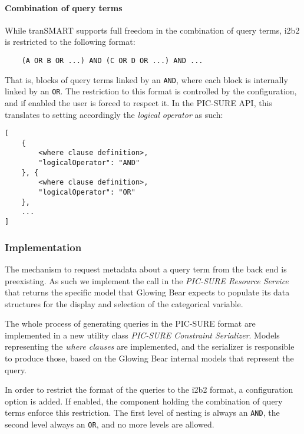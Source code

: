 \paragraph{Combination of query terms}
While tranSMART supports full freedom in the combination of query terms, i2b2 is restricted to the following format:
\begin{verbatim}
    (A OR B OR ...) AND (C OR D OR ...) AND ...
\end{verbatim}
That is, blocks of query terms linked by an \verb|AND|, where each block is internally linked by an \verb|OR|.
The restriction to this format is controlled by the configuration, and if enabled the user is forced to respect it.
In the PIC-SURE API, this translates to setting accordingly the \emph{logical operator} as such:
\begin{samepage}
\begin{verbatim}
[
    { 
        <where clause definition>,
        "logicalOperator": "AND"
    }, {
        <where clause definition>,
        "logicalOperator": "OR"
    },
    ...
]
\end{verbatim}
\end{samepage}



\subsubsection{Implementation}

The mechanism to request metadata about a query term from the back end is preexisting.
As such we implement the call in the \emph{PIC-SURE Resource Service} that returns the specific model that Glowing Bear expects to populate its data structures for the display and selection of the categorical variable.

The whole process of generating queries in the PIC-SURE format are implemented in a new utility class \emph{PIC-SURE Constraint Serializer}.
Models representing the \emph{where clauses} are implemented, and the serializer is responsible to produce those, based on the Glowing Bear internal models that represent the query.

In order to restrict the format of the queries to the i2b2 format, a configuration option is added.
If enabled, the component holding the combination of query terms enforce this restriction.
The first level of nesting is always an \verb|AND|, the second level always an \verb|OR|, and no more levels are allowed.


